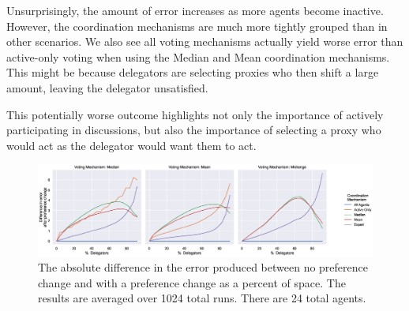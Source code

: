 Unsurprisingly, the amount of error increases as more agents become inactive.
However, the coordination mechanisms are much more tightly grouped than in other
scenarios.
We also see all voting mechanisms actually yield worse error than active-only
voting when using the Median and Mean coordination mechanisms.
This might be because delegators are selecting proxies who then shift a large amount,
leaving the delegator unsatisfied.

This potentially worse outcome highlights not only the importance of actively
participating in discussions, but also the importance of selecting a proxy who would
act as the delegator would want them to act.

\begin{landscape}
    \begin{figure}[p]
        \centering
        \includegraphics[scale=0.55]
        {content/chapter2/figures/abs_diff_from_preference_change_error_as_percent_of_space_abs_mean}
        \caption{
            The absolute difference in the error produced between no preference
            change and with a preference change as a percent of space.
            The results are averaged over 1024 total runs.
            There are 24 total agents.
        }
        \label{fig:abs-diff-from-preference-change-error-as-percent-of-space-abs-mean}
    \end{figure}
\end{landscape}
